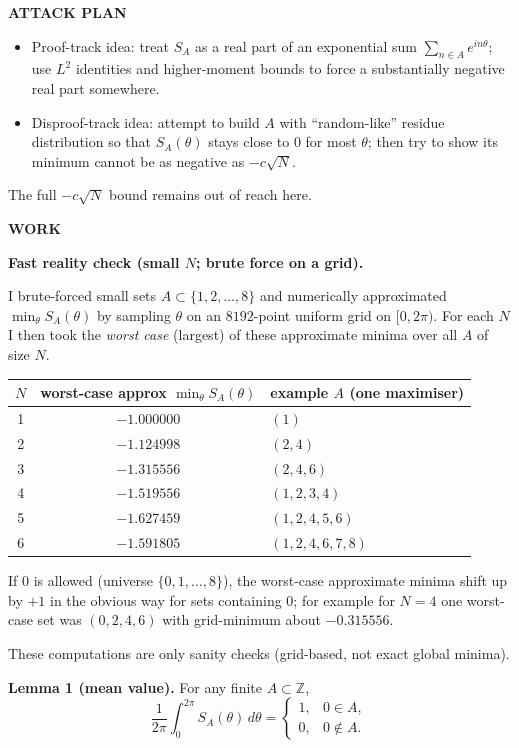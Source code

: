 \medskip
\noindent\textbf{ATTACK PLAN}

\begin{itemize}
\item Proof-track idea: treat $S_A$ as a real part of an exponential sum $\sum_{n\in A} e^{in\theta}$; use $L^2$ identities and higher-moment bounds to force a substantially negative real part somewhere.
\item Disproof-track idea: attempt to build $A$ with ``random-like'' residue distribution so that $S_A(\theta)$ stays close to $0$ for most $\theta$; then try to show its minimum cannot be as negative as $-c\sqrt{N}$.
\end{itemize}
The full $-c\sqrt{N}$ bound remains out of reach here.

\medskip
\noindent\textbf{WORK}

\noindent\textbf{Fast reality check (small $N$; brute force on a grid).}

I brute-forced small sets $A\subset\{1,2,\dots,8\}$ and numerically approximated $\min_{\theta} S_A(\theta)$ by sampling $\theta$ on an $8192$-point uniform grid on $[0,2\pi)$. For each $N$ I then took the \emph{worst case} (largest) of these approximate minima over all $A$ of size $N$.

\begin{center}
\begin{tabular}{c|c|l}
$N$ & worst-case approx $\min_{\theta} S_A(\theta)$ & example $A$ (one maximiser)\\
\hline
1 & $-1.000000$ & $(1)$\\
2 & $-1.124998$ & $(2,4)$\\
3 & $-1.315556$ & $(2,4,6)$\\
4 & $-1.519556$ & $(1,2,3,4)$\\
5 & $-1.627459$ & $(1,2,4,5,6)$\\
6 & $-1.591805$ & $(1,2,4,6,7,8)$\\
\end{tabular}
\end{center}
If $0$ is allowed (universe $\{0,1,\dots,8\}$), the worst-case approximate minima shift up by $+1$ in the obvious way for sets containing $0$; for example for $N=4$ one worst-case set was $(0,2,4,6)$ with grid-minimum about $-0.315556$.

These computations are only sanity checks (grid-based, not exact global minima).

\medskip
\noindent\textbf{Lemma 1 (mean value).}
For any finite $A\subset\mathbb{Z}$,
\[
\frac{1}{2\pi}\int_0^{2\pi} S_A(\theta)\,d\theta = \begin{cases}
1,& 0\in A,\\
0,& 0\notin A.
\end{cases}
\]

